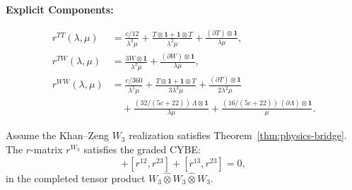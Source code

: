 \textbf{Explicit Components:}

\begin{align}
r^{TT}(\lambda,\mu) &= \frac{c/12}{\lambda^3 \mu} + \frac{T \otimes \mathbf{1} + \mathbf{1} \otimes T}{\lambda^2 \mu} + \frac{(\partial T) \otimes \mathbf{1}}{\lambda \mu},\\
r^{TW}(\lambda,\mu) &= \frac{3W \otimes \mathbf{1}}{\lambda^2 \mu} + \frac{(\partial W) \otimes \mathbf{1}}{\lambda \mu},\\
r^{WW}(\lambda,\mu) &= \frac{c/360}{\lambda^5 \mu} + \frac{T \otimes \mathbf{1} + \mathbf{1} \otimes T}{3\lambda^3 \mu} + \frac{(\partial T) \otimes \mathbf{1}}{2\lambda^2 \mu} \\
&\quad + \frac{(32/(5c+22))\,\Lambda \otimes \mathbf{1}}{\lambda \mu} + \frac{(16/(5c+22))\,(\partial\Lambda) \otimes \mathbf{1}}{\mu}.
\end{align}

\begin{theorem}
Assume the Khan--Zeng $W_3$ realization satisfies
Theorem~\ref{thm:physics-bridge}.
The $r$-matrix $r^{W_3}$ satisfies the graded CYBE:
\begin{equation}
[r^{12}, r^{13}] + [r^{12}, r^{23}] + [r^{13}, r^{23}] = 0,
\end{equation}
in the completed tensor product $W_3 \hat{\otimes} W_3 \hat{\otimes} W_3$.
\end{theorem}

